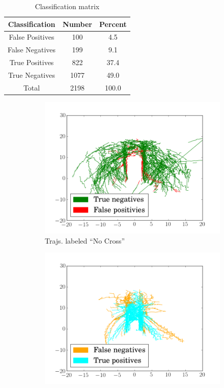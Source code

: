 \begin{table}[ht!]
\centering
\begin{tabular}{||c||c c||}  
 \hline
 Classification & Number & Percent \\
 \hline\hline
 False Positives & 100 & 4.5 \\ \hline
 False Negatives & 199 & 9.1 \\ \hline
 True Positives & 822 & 37.4 \\ \hline
 True Negatives & 1077 & 49.0 \\ \hline\hline
 Total & 2198 & 100.0\\ \hline
\end{tabular}
\caption{Classification matrix}
\label{table_svm_outputs}
\end{table}

\begin{figure}
\centering
\begin{subfigure}{.25\textwidth}
  \centering
  \includegraphics[width=.9\linewidth]{figures/svm_label0}
  \caption{Trajs. labeled ``No Cross''}
  \label{fig:svm_label0}
\end{subfigure}%
\begin{subfigure}{.25\textwidth}
  \centering
  \includegraphics[width=.9\linewidth]{figures/svm_label1}

\end{subfigure}
\end{figure}
